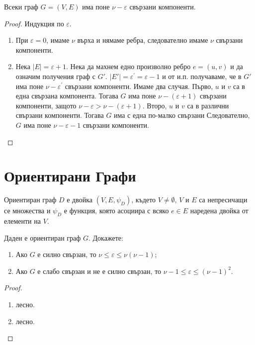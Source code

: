 \begin{problem}
  Всеки граф $G=(V,E)$ има поне $\nu-\varepsilon$ свързани компоненти.
\end{problem}
\begin{proof}
  Индукция по $\varepsilon$.
  \begin{enumerate}
  \item
    При $\varepsilon = 0$, имаме $\nu$ върха и нямаме ребра, следователно имаме $\nu$ свързани компоненти.
  \item
    Нека $|E| = \varepsilon+1$.
    Нека да махнем едно произволно ребро $e=(u,v)$ и да означим получения граф с $G'$.
    $|E'| = \varepsilon^\prime = \varepsilon - 1$ и от и.п. получаваме, че в $G'$ има поне $\nu-\varepsilon^\prime$ свързани компоненти.
    Имаме два случая.
    Първо, $u$ и $v$ са в една свързана компонента. 
    Тогава $G$ има поне $\nu-(\varepsilon+1)$ свързани компоненти, защото $\nu-\varepsilon > \nu - (\varepsilon+1)$.
    Второ, $u$ и $v$ са в различни свързани компоненти.
    Тогава $G$ има с една по-малко свързани 
    Следователно, $G$ има поне $\nu - \varepsilon - 1$  свързани компоненти.
\end{enumerate}
\end{proof}



\section{Ориентирани Графи}

\begin{dfn}
  Ориентиран граф $D$ е двойка $(V,E,\psi_D)$, където $V\neq\emptyset$, $V$ и $E$ са непресичащи се множества
  и $\psi_D$ е функция, която асоциира с всяко $e\in E$ наредена двойка от елементи на $V$.
\end{dfn}

\begin{problem}
  Даден е ориентиран граф $G$. Докажете:
  \begin{enumerate}
  \item
    Ако $G$ е силно свързан, то $\nu \leq \varepsilon \leq \nu(\nu-1)$;
  \item
    Ако $G$ е слабо свързан и не е силно свързан, то $\nu-1 \leq \varepsilon \leq (\nu-1)^2$.
\end{enumerate}
\end{problem}
\begin{proof}
  \begin{enumerate}
  \item
    лесно.
  \item
    лесно.
\end{enumerate}
\end{proof}



